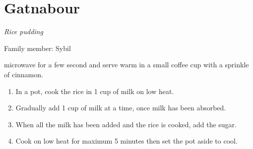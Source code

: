 \chapter{Gatnabour}
\label{ch:gatnabour}


\textit{Rice pudding}

Family member: Sybil

 microwave for a few second and serve warm in a small coffee cup with a sprinkle of cinnamon.


\begin{enumerate}
    \item In a pot, cook the rice in 1 cup of milk on low heat.
    \item Gradually add 1 cup of milk at a time, once milk has been absorbed.
    \item When all the milk has been added and the rice is cooked, add the sugar.
    \item Cook on low heat for maximum 5 minutes then set the pot aside to cool.
\end{enumerate}
